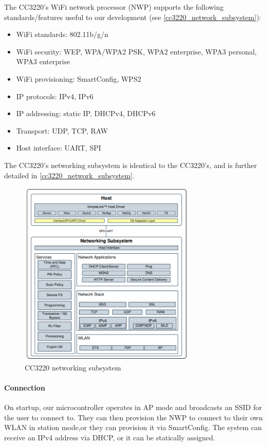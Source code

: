The CC3220's WiFi network processor (NWP) supports the following
standards/features useful to our development
(see \autoref{cc3220_network_subsystem}):
\begin{itemize}
    \item WiFi standards: 802.11b/g/n
    \item WiFi security: WEP, WPA/WPA2 PSK, WPA2 enterprise, WPA3 personal,
    WPA3 enterprise
    \item WiFi provisioning: SmartConfig, WPS2
    \item IP protocols: IPv4, IPv6
    \item IP addressing: static IP, DHCPv4, DHCPv6
    \item Transport: UDP, TCP, RAW
    \item Host interface: UART, SPI
\end{itemize}
The CC3220's networking subsystem is identical to the CC3220's, and is further detailed in \autoref{cc3220_network_subsystem}.
\begin{figure}[H]
    \caption{CC3220 networking subsystem \cite{swru455m}}
    \label{cc3220_network_subsystem}
    \centering
    \includegraphics[width=0.75\textwidth]{images/cc3220_network_subsystem.png}
\end{figure}
\paragraph{Connection}
On startup, our microcontroller operates in AP mode and broadcasts an SSID for the user to connect to. They can then provision the NWP to connect to their own WLAN in station mode,or they can provision it via SmartConfig. The system can receive an IPv4 address via DHCP, or it can be statically assigned.

